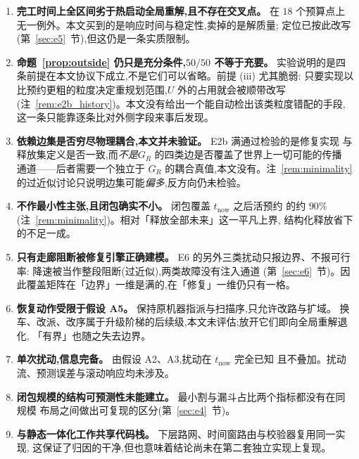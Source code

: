 \documentclass[manuscript,screen,review]{acmart}
\newcommand{\NPairs}{50}
\newcommand{\PassInvar}{\NPairs/\NPairs}     %
\newcommand{\ClosureAliveFrac}{90\%}
\begin{document}
\begin{enumerate}[leftmargin=1.6em,itemsep=0.35em]
\item \textbf{完工时间上全区间劣于热启动全局重解,且不存在交叉点。}
在 \(18\) 个预算点上无一例外。本文买到的是响应时间与稳定性,卖掉的是解质量;
定位已按此改写(第~\ref{sec:e5}~节),但这仍是一条实质限制。

\item \textbf{命题~\ref{prop:outside} 仍只是充分条件,\(\PassInvar\) 不等于充要。}
实验说明的是四条前提在本文协议下成立,不是它们可以省略。前提 (iii) 尤其脆弱:
只要实现以比预约更粗的粒度决定重规划范围,\(U\) 外的占用就会被顺带改写
(注~\ref{rem:e2b_history})。本文没有给出一个能自动检出该类粒度错配的手段,
这一条只能靠逐条比对外侧字段来事后发现。

\item \textbf{依赖边集是否穷尽物理耦合,本文并未验证。} E2b 满通过检验的是修复实现
与释放集定义是否一致,而\emph{不是}\(G_R\) 的四类边是否覆盖了世界上一切可能的传播
通道——后者需要一个独立于 \(G_R\) 的耦合真值,本文没有。注~\ref{rem:minimality}
的过近似讨论只说明边集可能\emph{偏多},反方向仍未检验。

\item \textbf{不作最小性主张,且闭包确实不小。} 闭包覆盖 \(t_{\mathrm{now}}\) 之后活预约
的约 \(\ClosureAliveFrac\)(注~\ref{rem:minimality})。相对「释放全部未来」这一平凡上界,
结构化释放省下的不足一成。

\item \textbf{只有走廊阻断被修复引擎正确建模。} E6 的另外三类扰动只报边界、不报可行率:
降速被当作整段阻断(过近似),两类故障没有注入通道
(第~\ref{sec:e6}~节)。因此覆盖矩阵在「边界」一维是满的,在「修复」一维仍只有一格。

\item \textbf{恢复动作受限于假设 A5。} 保持原机器指派与扫描序,只允许改路与扩域。
换车、改派、改序属于升级阶梯的后续级,本文未评估;放开它们即向全局重解退化,
「有界」也随之失去边界。

\item \textbf{单次扰动,信息完备。} 由假设 A2、A3,扰动在 \(t_{\mathrm{now}}\) 完全已知
且不叠加。扰动流、预测误差与滚动响应均未涉及。

\item \textbf{闭包规模的结构可预测性未能建立。} 最小割与漏斗占比两个指标都没有在同规模
布局之间做出可复现的区分(第~\ref{sec:e4}~节)。

\item \textbf{与静态一体化工作共享代码栈。} 下层路网、时间窗路由与校验器复用同一实现,
这保证了归因的干净,但也意味着结论尚未在第二套独立实现上复现。
\end{enumerate}
\end{document}
